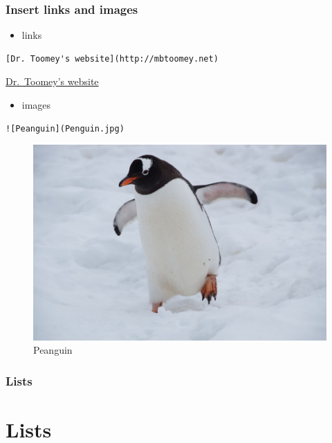 \documentclass[
]{article}
\providecommand{\tightlist}{%
  \setlength{\itemsep}{0pt}\setlength{\parskip}{0pt}}
\begin{document}
\hypertarget{insert-links-and-images}{%
\subsubsection{Insert links and images}\label{insert-links-and-images}}

\begin{itemize}
\tightlist
\item
  links
\end{itemize}

\begin{verbatim}
[Dr. Toomey's website](http://mbtoomey.net)
\end{verbatim}

\href{http://mbtoomey.net}{Dr.~Toomey's website}

\begin{itemize}
\tightlist
\item
  images
\end{itemize}

\begin{verbatim}
![Peanguin](Penguin.jpg)
\end{verbatim}

\begin{figure}
\centering
\includegraphics{Penguin.jpg}
\caption{Peanguin}
\end{figure}

\hypertarget{lists}{%
\subsubsection{Lists}\label{lists}}

\hypertarget{lists-1}{%
\section{Lists}\label{lists-1}}
\end{document}
